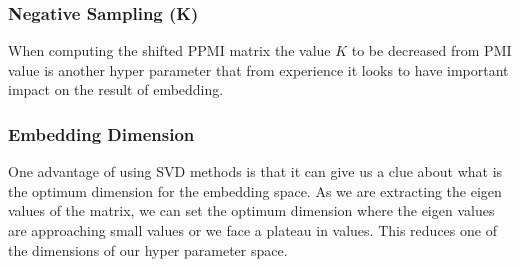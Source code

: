 \subsubsection{Negative Sampling (K)}

When computing the shifted PPMI matrix the value $K$ to be decreased from PMI value is another hyper parameter that from experience it looks to have important impact on the result of embedding.  

\subsubsection{Embedding Dimension}
One advantage of using SVD methods is that it can give us a clue about what is the optimum dimension for the embedding space. As we are extracting the eigen values of the matrix, we can set the optimum dimension where the eigen values are approaching small values or we face a plateau in values.  This reduces one of the dimensions of  our hyper parameter space.  


